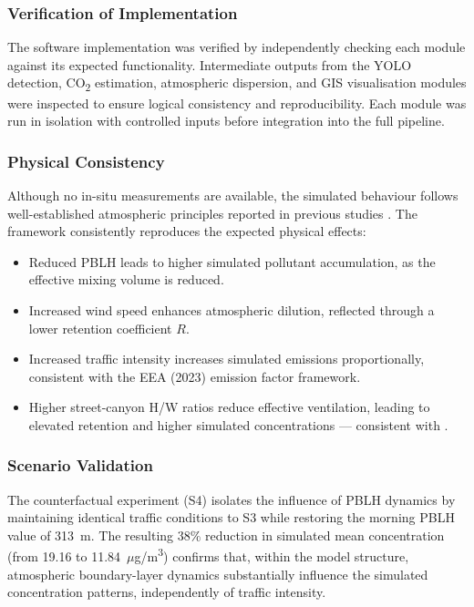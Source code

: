 \documentclass[12pt,a4paper]{article}
\begin{document}
\subsubsection{Verification of Implementation}
The software implementation was verified by independently checking each module against its expected functionality. Intermediate outputs from the YOLO detection, CO\textsubscript{2} estimation, atmospheric dispersion, and GIS visualisation modules were inspected to ensure logical consistency and reproducibility. Each module was run in isolation with controlled inputs before integration into the full pipeline.

\subsubsection{Physical Consistency}
Although no in-situ measurements are available, the simulated behaviour follows well-established atmospheric principles reported in previous studies \cite{Oke1988,Peng2023,Deng2023}. The framework consistently reproduces the expected physical effects:
\begin{itemize}
  \item Reduced PBLH leads to higher simulated pollutant accumulation, as the effective mixing volume is reduced.
  \item Increased wind speed enhances atmospheric dilution, reflected through a lower retention coefficient $R$.
  \item Increased traffic intensity increases simulated emissions proportionally, consistent with the EEA (2023) emission factor framework.
  \item Higher street-canyon H/W ratios reduce effective ventilation, leading to elevated retention and higher simulated concentrations --- consistent with \cite{Oke1988,Vardoulakis2003}.
\end{itemize}

\subsubsection{Scenario Validation}
The counterfactual experiment (S4) isolates the influence of PBLH dynamics by maintaining identical traffic conditions to S3 while restoring the morning PBLH value of 313~m. The resulting 38\% reduction in simulated mean concentration (from 19.16 to 11.84~$\mu$g/m\textsuperscript{3}) confirms that, within the model structure, atmospheric boundary-layer dynamics substantially influence the simulated concentration patterns, independently of traffic intensity.
\end{document}

